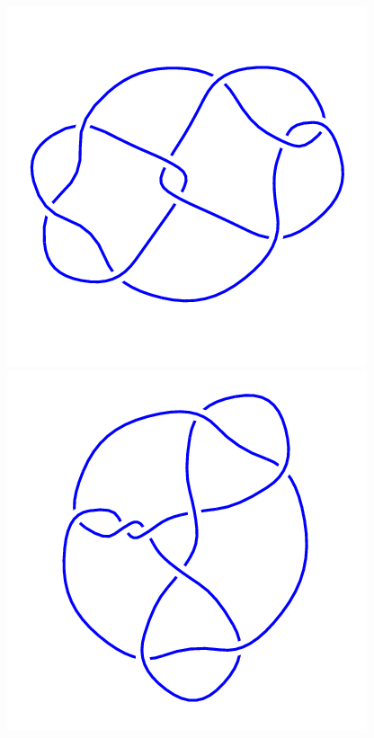 \begin{figure}[H]
	\begin{minipage}[b]{.18\linewidth}
		\centering
		\includegraphics[width=\linewidth]{../data/9_36.png}
	\end{minipage}
	\begin{minipage}[b]{.18\linewidth}
		\centering
		\includegraphics[width=\linewidth]{../data/9_37.png}

\end{minipage}
\end{figure}
